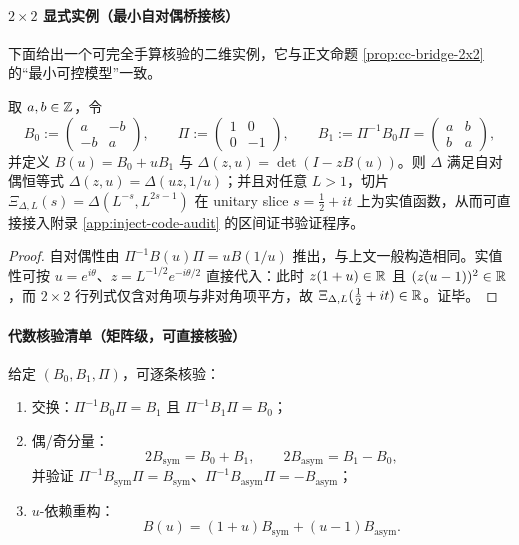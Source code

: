 \paragraph{$2\times 2$ 显式实例（最小自对偶桥接核）}
下面给出一个可完全手算核验的二维实例，它与正文命题 \ref{prop:cc-bridge-2x2} 的“最小可控模型”一致。
\begin{proposition}\label{prop:bridge-2x2-explicit}
取 $a,b\in\mathbb{Z}$，令
$$
B_0:=\begin{pmatrix} a & -b\\ -b & a\end{pmatrix},\qquad
\Pi:=\begin{pmatrix} 1 & 0\\ 0 & -1\end{pmatrix},\qquad
B_1:=\Pi^{-1}B_0\Pi=\begin{pmatrix} a & b\\ b & a\end{pmatrix},
$$
并定义 $B(u)=B_0+uB_1$ 与 $\Delta(z,u)=\det(I-zB(u))$。则 $\Delta$ 满足自对偶恒等式 $\Delta(z,u)=\Delta(uz,1/u)$；并且对任意 $L>1$，切片 $\Xi_{\Delta,L}(s)=\Delta(L^{-s},L^{2s-1})$ 在 unitary slice $s=\frac12+it$ 上为实值函数，从而可直接接入附录 \ref{app:inject-code-audit} 的区间证书验证程序。
\end{proposition}
\begin{proof}
自对偶性由 $\Pi^{-1}B(u)\Pi=uB(1/u)$ 推出，与上文一般构造相同。实值性可按 $u=e^{i\theta}$、$z=L^{-1/2}e^{-i\theta/2}$ 直接代入：此时 $z(1+u)\in\mathbb{R}$ 且 $(z(u-1))^2\in\mathbb{R}$，而 $2\times 2$ 行列式仅含对角项与非对角项平方，故 $\Xi_{\Delta,L}(\frac12+it)\in\mathbb{R}$。证毕。
\end{proof}

\paragraph{代数核验清单（矩阵级，可直接核验）}
给定 $(B_0,B_1,\Pi)$，可逐条核验：
\begin{enumerate}
  \item 交换：$\Pi^{-1}B_0\Pi=B_1$ 且 $\Pi^{-1}B_1\Pi=B_0$；
  \item 偶/奇分量：
  $$
  2B_{\mathrm{sym}}=B_0+B_1,\qquad 2B_{\mathrm{asym}}=B_1-B_0,
  $$
  并验证 $\Pi^{-1}B_{\mathrm{sym}}\Pi=B_{\mathrm{sym}}$、$\Pi^{-1}B_{\mathrm{asym}}\Pi=-B_{\mathrm{asym}}$；
  \item $u$-依赖重构：
  $$
  B(u)=(1+u)B_{\mathrm{sym}}+(u-1)B_{\mathrm{asym}}.
  $$
\end{enumerate}

